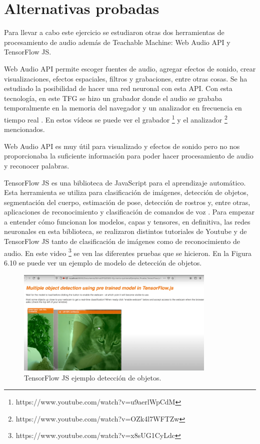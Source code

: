 \section{Alternativas probadas}

Para llevar a cabo este ejercicio se estudiaron otras dos herramientas de procesamiento de audio además de Teachable Machine: Web Audio API y TensorFlow JS.

Web Audio API permite escoger fuentes de audio, agregar efectos de sonido, crear visualizaciones, efectos espaciales, filtros y grabaciones, entre otras cosas.
Se ha estudiado la  posibilidad de hacer una red neuronal con esta API. Con esta tecnología, en este TFG se hizo un grabador donde el audio se grababa temporalmente en la memoria del navegador y un analizador en frecuencia en tiempo real \cite{waa} .  En estos vídeos se puede ver el grabador \footnote{https://www.youtube.com/watch?v=u9aerlWpCdM} y el analizador \footnote{https://www.youtube.com/watch?v=OZk4l7WFTZw} mencionados.

Web Audio API es muy útil para visualizado y efectos de sonido pero no nos proporcionaba la suficiente información para poder hacer procesamiento de audio y reconocer palabras.

TensorFlow JS es una biblioteca de JavaScript para el aprendizaje automático. Esta herramienta se utiliza para clasificación de imágenes, detección de objetos, segmentación del cuerpo, estimación de pose, detección de rostros y, entre otras, aplicaciones de reconocimiento y clasificación de comandos de voz \cite{tensorflowmodel}. Para empezar a entender cómo funcionan los modelos, capas y  tensores, en definitiva, las redes neuronales en esta biblioteca, se realizaron distintos tutoriales de Youtube y de TensorFlow JS tanto de clasificación de imágenes como de reconocimiento de audio. En este video \footnote{https://www.youtube.com/watch?v=x8sUG1CyLdc} se ven las diferentes pruebas que se hicieron. En la Figura 6.10 se puede ver un ejemplo de modelo de detección de objetos.

\begin{figure}[H]
    \centering
    \includegraphics[width=0.85\textwidth, height=0.5\textwidth]{chapters/images/imagerecognition.png}
    \caption{TensorFlow JS ejemplo detección de objetos. }
    \label{fig:my_label}
\end{figure}

